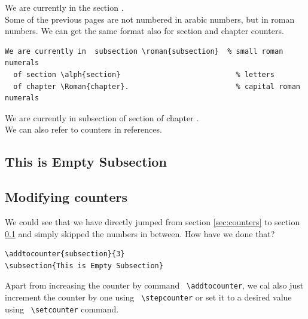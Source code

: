 \documentclass[a4paper,10pt]{report} %
\begin{document}
We are currently in  the section .\\

Some of the previous pages are not numbered in arabic numbers, but in roman numbers. We can get the same format also for section and chapter counters. 

\begin{lstlisting}[language={[latex]tex}, 
  frame=single,
  basicstyle=\footnotesize\color{darkgray}, 
  keywordstyle=\bf\color{magenta},
  commentstyle=\color{ForestGreen},  %
  breaklines=true
  ]
  We are currently in  subsection \roman{subsection}  % small roman numerals 
  of section \alph{section}                           % letters
  of chapter \Roman{chapter}.                         % capital roman numerals
\end{lstlisting}
 We are currently in  subsection   %
  of section                            %
  of chapter . \\                      %

  We can also refer to counters in references. 
  
  

\addtocounter{subsection}{3}
\subsection{This is Empty Subsection}\label{sec:empty}

\subsection{Modifying counters}

We could see that we have directly jumped from section \ref{sec:counters} to section \ref{sec:empty} and simply skipped the numbers in between.
How have we done that?
\begin{lstlisting}[language={[latex]tex},
  frame=single,
  basicstyle=\footnotesize\color{darkgray}, 
  keywordstyle=\bf\color{magenta},
  commentstyle=\color{ForestGreen},  %
  breaklines=true
  ]
\addtocounter{subsection}{3}
\subsection{This is Empty Subsection}  
\end{lstlisting}

Apart from increasing the counter by command \texttt{ \textbackslash addtocounter}, we cal also just increment the counter by one using \texttt{ \textbackslash stepcounter} or set it to a desired value using \texttt{ \textbackslash setcounter} command. 
  
\end{document}
